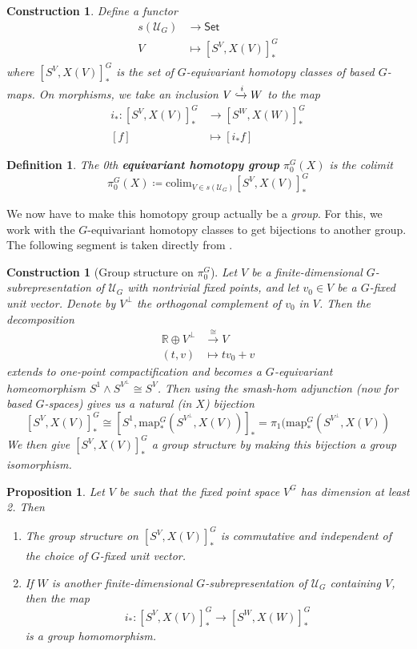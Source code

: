 \documentclass{scrartcl}
\newcommand{\textbi}[1]{\textbf{\textit{#1}}}
\newcommand{\bR}{\mathbb{R}}
\newcommand{\colim}{\mathrm{colim}}
\newtheorem{defin}[subsection]{Definition}
\newtheorem{prop}[subsection]{Proposition}
\newtheorem{cons}[subsection]{Construction}
\begin{document}
\begin{cons}
    Define a functor 
    \begin{align*}
        s(\mathcal{U}_G)&\to \mathsf{Set} \\
        V&\mapsto [S^V,X(V)]^G_*
    \end{align*} where $[S^V,X(V)]^G_*$ is the set of $G$-equivariant homotopy classes of based $G$-maps. On morphisms, we take an inclusion $V\xhookrightarrow{i} W$ to the map 
    \begin{align*}
        i_*: [S^V,X(V)]^G_*&\to [S^W,X(W)]^G_* \\
        [f] &\mapsto [i_*f]
    \end{align*}
\end{cons}

\begin{defin}
    The 0th \textbi{equivariant homotopy group} $\pi_0^G(X)$ is the colimit $$\pi_0^G(X)\coloneqq\colim_{V\in s(\mathcal{U}_G)}[S^V,X(V)]^G_*$$
\end{defin}

We now have to make this homotopy group actually be a \textit{group}. For this, we work with the $G$-equivariant homotopy classes to get bijections to another group. The following segment is taken directly from \cite[3.10]{GHT}.
\begin{cons}[Group structure on $\pi^G_0$]
    Let $V$ be a finite-dimensional $G$-subrepresentation of $\mathcal{U}_G$ with nontrivial fixed points, and let $v_0\in V$ be a $G$-fixed unit vector. Denote by $V^\perp$ the orthogonal complement of $v_0$ in $V$. Then the decomposition \begin{align*}
        \bR\oplus V^\perp&\xrightarrow{\cong} V\\
        (t,v) &\mapsto tv_0+v
    \end{align*} extends to one-point compactification and becomes a $G$-equivariant homeomorphism $S^1\wedge S^{V^\perp}\cong S^V$. Then using the smash-hom adjunction (now for based $G$-spaces) gives us a natural (in $X$) bijection $$[S^V, X(V)]^G_*\cong [S^1, \text{map}^G_*(S^{V^\perp}, X(V))]_*=\pi_1(\text{map}^G_*(S^{V^\perp}, X(V))$$
    We then give $[S^V, X(V)]^G_*$ a group structure by making this bijection a group isomorphism.
\end{cons}

\begin{prop}
    Let $V$ be such that the fixed point space $V^G$ has dimension at least 2. Then
    \begin{enumerate}
        \item The group structure on $[S^V, X(V)]^G_*$ is commutative and independent of the choice of $G$-fixed unit vector.
        \item  If $W$ is another finite-dimensional $G$-subrepresentation of $\mathcal{U}_G$ containing $V$, then the map $$i_*:[S^V, X(V)]^G_*\to [S^W, X(W)]^G_*$$ is a group homomorphism.
    \end{enumerate}
\end{prop}
\end{document}
